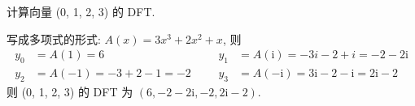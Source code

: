 \documentclass[boxes]{homework}
\begin{document}
\begin{problem}
计算向量 (0, 1, 2, 3) 的 DFT\@.
\end{problem}
\begin{solution}
    写成多项式的形式: $A(x) = 3x^{3} + 2x^{2} + x$, 则
    \begin{equation}
        \begin{aligned}
            y_{0} & = A(1) = 6                &  &  & y_{1} & = A(\mathrm{i}) =
            -3i - 2 + i = -2 - 2 \mathrm{i}                                     \\
            y_{2} & = A(-1) = -3 + 2 - 1 = -2 &  &  & y_{3} & = A(- \mathrm{i})
            = 3 \mathrm{i} - 2 - \mathrm{i} = 2 \mathrm{i} - 2
        \end{aligned}
    \end{equation}
    则 (0, 1, 2, 3) 的 DFT 为 $(6, -2 - 2 \mathrm{i}, -2, 2 \mathrm{i} - 2)$.
\end{solution}
\end{document}
